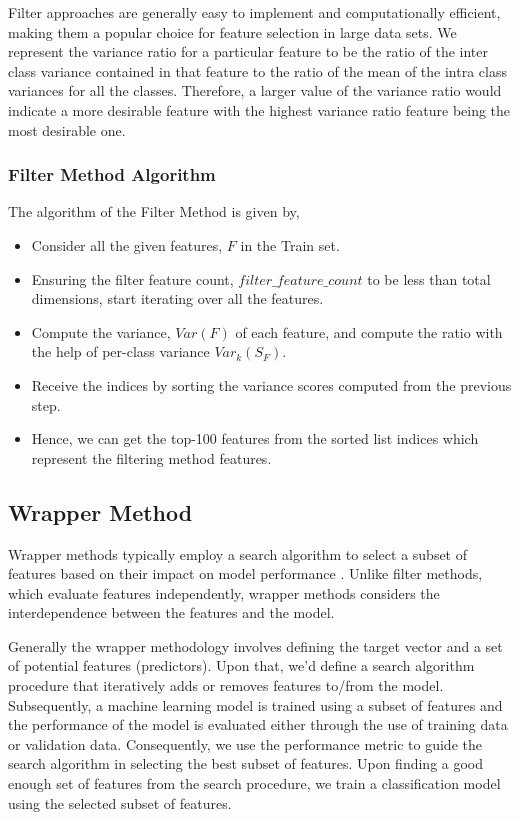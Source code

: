 \documentclass[12pt,twoside,a4paper]{article}
\begin{document}
Filter approaches are generally easy to implement and computationally efficient, making them a popular choice for feature selection in large data sets. We represent the variance ratio for a particular feature to be the ratio of the inter class variance contained in that feature to the ratio of the mean of the intra class variances for all the classes. Therefore, a larger value of the variance ratio would indicate a more desirable feature with the highest variance ratio feature being the most desirable one. \\

\subsubsection*{Filter Method Algorithm}
The algorithm of the Filter Method is given by,
\begin{itemize}
    \item Consider all the given features, $F$ in the Train set.
    \item Ensuring the filter feature count, $filter\_feature\_count$ to be less than total dimensions, start iterating over all the features.
    \item Compute the variance, $Var(F)$ of each feature, and compute the ratio with the help of per-class variance $Var_k(S_F)$.
    \item Receive the indices by sorting the variance scores computed from the previous step.
    \item Hence, we can get the top-100 features from the sorted list indices which represent the filtering method features.
\end{itemize}

\subsection{Wrapper Method}

Wrapper methods typically employ a search algorithm to select a subset of features based on their impact on model performance \cite{feature}. Unlike filter methods, which evaluate features independently, wrapper methods considers the interdependence between the features and the model.

Generally the wrapper methodology involves defining the target vector and a set of potential features (predictors). Upon that, we'd define a search algorithm procedure that iteratively adds or removes features to/from the model. Subsequently, a machine learning model is trained using a subset of features and the performance of the model is evaluated either through the use of training data or validation data. Consequently, we use the performance metric to guide the search algorithm in selecting the best subset of features. Upon finding a good enough set of features from the search procedure, we train a classification model using the selected subset of features.
\end{document}
